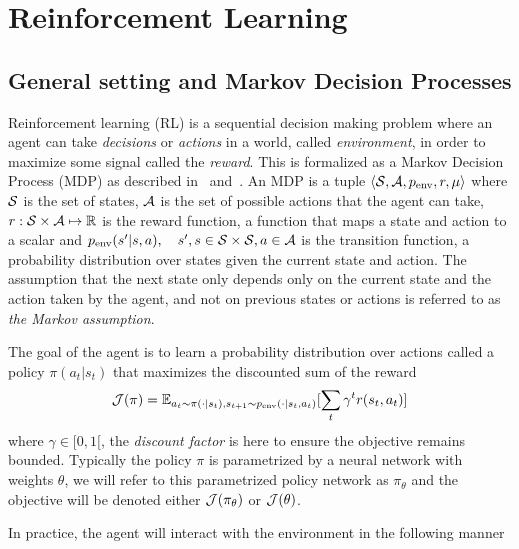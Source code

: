 
\section{Reinforcement Learning}
\label{sec:RL}
\subsection{General setting and Markov Decision Processes}

Reinforcement learning (RL) is a sequential decision making problem where an
agent can take \textit{decisions} or \textit{actions} in a world, called
\textit{environment}, in order to maximize some signal called the
\textit{reward}. This is formalized as a Markov Decision Process (MDP) as
described in~\citet{bellman1954theory} and~\citet{puterman2014markov}. An MDP is
a tuple $\langle {\mathcal{S}}, {\mathcal{A}}, p_{\text{env}}, r, \mu\rangle$ where ${\mathcal{S}}$ is the set of
states, ${\mathcal{A}}$ is the set of possible actions that the agent can take, $r: {\mathcal{S}} \times {\mathcal{A}} \mapsto \mathbb{R}$ is the reward function, a function that maps a state and action to a scalar and $p_{\text{env}}(s' | s, a), \quad s', s \in {\mathcal{S}} \times {\mathcal{S}}, a \in {\mathcal{A}}$ is the transition function, a probability distribution over states given the current state and action. The assumption that the next state only depends only on the current state and the action taken by the agent, and not on previous states or actions is referred to as \emph{the Markov assumption}.

The goal of the agent is to learn a probability distribution over actions called a policy $\pi(a_t|s_t)$ that maximizes the discounted sum of the reward
$${\mathcal{J}}(\pi) = \mathbb{E}_{a_t \sim \pi(\cdot|s_t), s_{t+1} \sim p_{\text{env}}(\cdot | s_t, a_t)}[\sum_t \gamma^t r(s_t, a_t)]$$
where $\gamma \in [0, 1 [$, the \emph{discount factor} is here to ensure the objective remains bounded. Typically the policy $\pi$ is parametrized by a neural network with weights $\theta$, we will refer to this parametrized policy network as $\pi_\theta$ and the objective will be denoted either ${\mathcal{J}}(\pi_\theta)$ or ${\mathcal{J}}(\theta)$.

In practice, the agent will interact with the environment in the following manner

